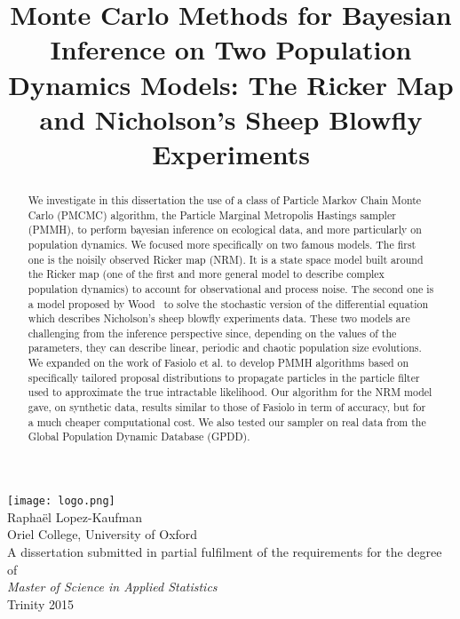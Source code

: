 \documentclass[12pt]{article}
\title{Monte Carlo Methods for Bayesian Inference on Two Population
	Dynamics Models: The Ricker Map and Nicholson's Sheep Blowfly Experiments}
\date{}
\begin{document}
	\maketitle 
	\thispagestyle{empty}
	\begin{center}
		\vspace{-5mm}
		\texttt{[image: logo.png]} \\
		\vspace{20mm}
		{\large Raphaël Lopez-Kaufman} \\
		\vspace{2mm}
		{\large Oriel College, University of Oxford} \\
		\vspace{40mm}
		A dissertation submitted in partial fulfilment of the requirements for the degree of \\
		\vspace{1mm}
		\textit{Master of Science in Applied Statistics} \\
		\vspace{1mm}
		Trinity 2015
	\end{center}
	
	\vspace{25 mm}
	
	\begin{abstract}
		We investigate in this dissertation the use of a class of Particle Markov Chain Monte Carlo (PMCMC) algorithm, the Particle Marginal Metropolis Hastings sampler (PMMH), to perform bayesian inference on ecological data, and more particularly on population dynamics. We focused more specifically on two famous models. The first one is the noisily observed Ricker map (NRM). It is a state space model built around the Ricker map (one of the first and more general model to describe complex population dynamics) to account for observational and process noise. The second one is a model proposed by Wood~\cite{wood2010statistical} to solve the stochastic version of the differential equation which describes Nicholson's sheep blowfly experiments data. These two models are challenging from the inference perspective since, depending on the values of the parameters, they can describe linear, periodic and chaotic population size evolutions. We expanded on the work of Fasiolo et al.\cite{fasiolo2014statistical} to develop PMMH algorithms based on specifically tailored proposal distributions to propagate particles in the particle filter used to approximate the true intractable likelihood. Our algorithm for the NRM model gave, on synthetic data, results similar to those of Fasiolo in term of accuracy, but for a much cheaper computational cost. We also tested our sampler on real data from the Global Population Dynamic Database (GPDD). 
	\end{abstract}
	
\end{document}
